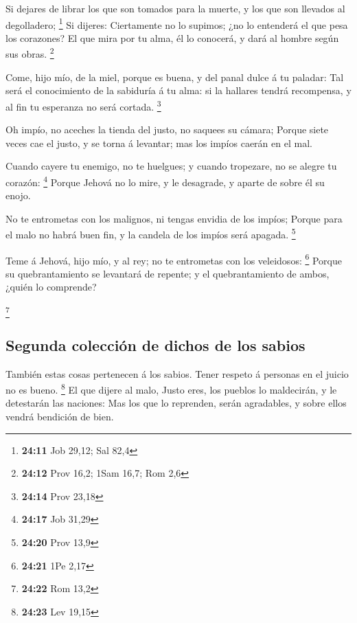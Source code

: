  Si dejares de librar los que son tomados para la muerte,
y los que son llevados al degolladero; \footnote{\textbf{24:11} Job
  29,12; Sal 82,4}  Si dijeres: Ciertamente no lo
supimos; ¿no lo entenderá el que pesa los corazones? El que mira por tu
alma, él lo conocerá, y dará al hombre según sus obras. \footnote{\textbf{24:12}
  Prov 16,2; 1Sam 16,7; Rom 2,6}

 Come, hijo mío, de la miel, porque es buena, y del panal
dulce á tu paladar:  Tal será el conocimiento de la
sabiduría á tu alma: si la hallares tendrá recompensa, y al fin tu
esperanza no será cortada. \footnote{\textbf{24:14} Prov 23,18}

 Oh impío, no aceches la tienda del justo, no saquees su
cámara;  Porque siete veces cae el justo, y se torna á
levantar; mas los impíos caerán en el mal.

 Cuando cayere tu enemigo, no te huelgues; y cuando
tropezare, no se alegre tu corazón: \footnote{\textbf{24:17} Job 31,29}
 Porque Jehová no lo mire, y le desagrade, y aparte de
sobre él su enojo.

 No te entrometas con los malignos, ni tengas envidia de
los impíos;  Porque para el malo no habrá buen fin, y la
candela de los impíos será apagada. \footnote{\textbf{24:20} Prov 13,9}

 Teme á Jehová, hijo mío, y al rey; no te entrometas con
los veleidosos: \footnote{\textbf{24:21} 1Pe 2,17} 
Porque su quebrantamiento se levantará de repente; y el quebrantamiento
de ambos, ¿quién lo comprende?

\footnote{\textbf{24:22} Rom 13,2}

\hypertarget{segunda-colecciuxf3n-de-dichos-de-los-sabios}{%
\subsection{Segunda colección de dichos de los
sabios}\label{segunda-colecciuxf3n-de-dichos-de-los-sabios}}

 También estas cosas pertenecen á los sabios. Tener
respeto á personas en el juicio no es bueno. \footnote{\textbf{24:23}
  Lev 19,15}  El que dijere al malo, Justo eres, los
pueblos lo maldecirán, y le detestarán las naciones:  Mas
los que lo reprenden, serán agradables, y sobre ellos vendrá bendición
de bien.

